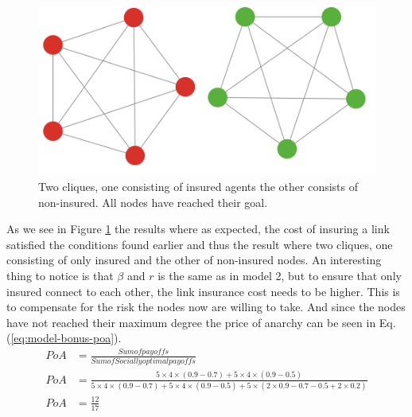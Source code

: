 \begin{figure}[h]
\centering
  \includegraphics[width=0.8\linewidth]{../Figures/BonusGameInsuredClique.png}
  \caption{\label{fig:bonusoptimal} Two cliques, one consisting of insured agents the other consists of non-insured. All nodes have reached their goal. }
\end{figure}
As we see in Figure \ref{fig:bonusoptimal} the results where as expected, the cost of insuring a link satisfied the conditions found earlier and thus the result where two cliques, one consisting of only insured and the other of non-insured nodes.
An interesting thing to notice is that $\beta$ and $r$ is the same as in model 2, but to ensure that only insured connect to each other, the link insurance cost needs to be higher. This is to compensate for the risk the nodes now are willing to take. And since the nodes have not reached their maximum degree the price of anarchy can be seen in Eq. (\ref{eq:model-bonus-poa}).
\begin{eqnarray}
PoA&=\frac{Sum of payoffs}{Sum of Socially optimal payoffs}  \nonumber \\
PoA&=\frac{5\times 4\times (0.9-0.7)+5\times 4\times(0.9-0.5)}{5\times 4\times (0.9-0.7)+5\times 4\times(0.9-0.5)+5\times (2\times 0.9-0.7-0.5 + 2 \times 0.2)}\nonumber \\
PoA&=\frac{12}{17}
\label{eq:model-bonus-poa}
\end{eqnarray}


